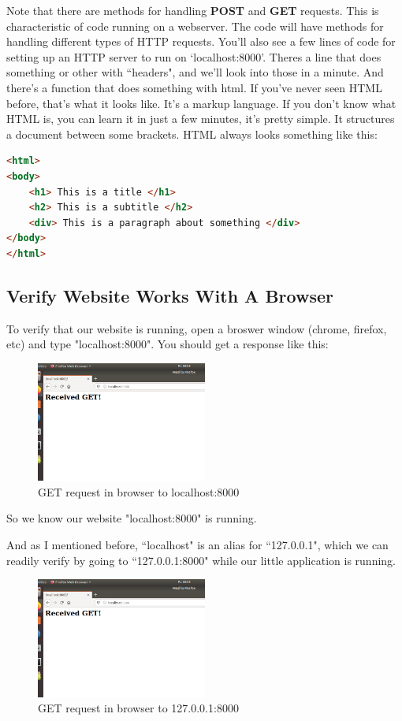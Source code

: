 \documentclass[10pt]{article}
\begin{document}
Note that there are methods for handling \textbf{POST} and \textbf{GET} requests. This is characteristic of code running on a webserver. The code will have methods for handling different types of HTTP requests. You'll also see a few lines of code for setting up an HTTP server to run on `localhost:8000'. Theres a line that does something or other with ``headers", and we'll look into those in a minute. And there's a function that does something with html. If you've never seen HTML before, that's what it looks like. It's a markup language. If you don't know what HTML is, you can learn it in just a few minutes, it's pretty simple. It structures a document between some brackets. HTML always looks something like this:

\begin{lstlisting}[language=HTML]
<html>
<body>
	<h1> This is a title </h1>
	<h2> This is a subtitle </h2>
	<div> This is a paragraph about something </div>
</body>
</html>
\end{lstlisting}

\subsection{Verify Website Works With A Browser}
To verify that our website is running, open a broswer window (chrome, firefox, etc) and type "localhost:8000". You should get a response like this:

\begin{figure}[h]
  \centering
    \includegraphics[width=0.5\textwidth]{GET.png}
  \caption{GET request in browser to localhost:8000}
\end{figure}

So we know our website "localhost:8000" is running.

And as I mentioned before, ``localhost" is an alias for ``127.0.0.1", which we can readily verify by going to ``127.0.0.1:8000" while our little application is running.

\begin{figure}[h]
  \centering
    \includegraphics[width=0.5\textwidth]{GET.png}
  \caption{GET request in browser to 127.0.0.1:8000 }
\end{figure}
\end{document}
